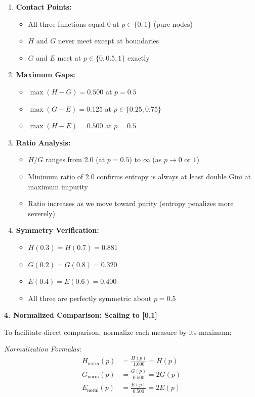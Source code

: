 \documentclass[12pt]{article}
\begin{document}
\begin{explanation}
\begin{enumerate}
    \item \textbf{Contact Points:}
    \begin{itemize}
        \item All three functions equal 0 at $p \in \{0, 1\}$ (pure nodes)
        \item $H$ and $G$ never meet except at boundaries
        \item $G$ and $E$ meet at $p \in \{0, 0.5, 1\}$ exactly
    \end{itemize}

    \item \textbf{Maximum Gaps:}
    \begin{itemize}
        \item $\max(H - G) = 0.500$ at $p = 0.5$
        \item $\max(G - E) = 0.125$ at $p \in \{0.25, 0.75\}$
        \item $\max(H - E) = 0.500$ at $p = 0.5$
    \end{itemize}

    \item \textbf{Ratio Analysis:}
    \begin{itemize}
        \item $H/G$ ranges from 2.0 (at $p=0.5$) to $\infty$ (as $p \to 0$ or $1$)
        \item Minimum ratio of 2.0 confirms entropy is always at least double Gini at maximum impurity
        \item Ratio increases as we move toward purity (entropy penalizes more severely)
    \end{itemize}

    \item \textbf{Symmetry Verification:}
    \begin{itemize}
        \item $H(0.3) = H(0.7) = 0.881$
        \item $G(0.2) = G(0.8) = 0.320$
        \item $E(0.4) = E(0.6) = 0.400$
        \item All three are perfectly symmetric about $p = 0.5$
    \end{itemize}
\end{enumerate}

\textbf{4. Normalized Comparison: Scaling to [0,1]}

To facilitate direct comparison, normalize each measure by its maximum:

\textit{Normalization Formulas:}
\begin{align*}
H_{\text{norm}}(p) &= \frac{H(p)}{1.000} = H(p) \\
G_{\text{norm}}(p) &= \frac{G(p)}{0.500} = 2G(p) \\
E_{\text{norm}}(p) &= \frac{E(p)}{0.500} = 2E(p)
\end{align*}


\end{explanation}
\end{document}
